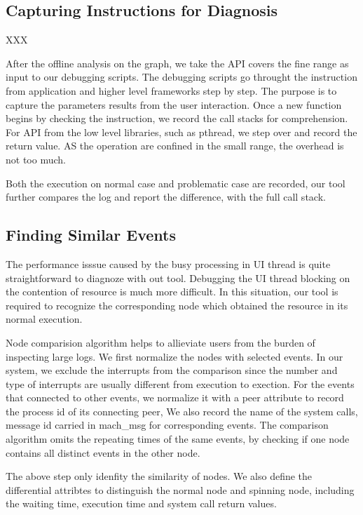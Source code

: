 \subsection{Capturing Instructions for Diagnosis}

XXX

After the offline analysis on the graph, we take the API covers the fine range as input to our debugging scripts.
The debugging scripts go throught the instruction from application and higher level frameworks step by step.
The purpose is to capture the parameters results from the user interaction.
Once a new function begins by checking the instruction, we record the call stacks for comprehension. 
For API from the low level libraries, such as pthread, we step over and record the return value.
AS the operation are confined in the small range, the overhead is not too much.

Both the execution on normal case and problematic case are recorded, our tool further compares the log and report
the difference, with the full call stack.

\subsection{Finding Similar Events}

The performance isssue caused by the busy processing in UI thread is quite straightforward to diagnoze with out tool.
Debugging the UI thread blocking on the contention of resource is much more difficult.
In this situation, our tool is required to recognize the corresponding node
which obtained the resource in its normal execution.

Node comparision algorithm helps to allieviate users from the burden of inspecting large logs.
We first normalize the nodes with selected events.
In our system, we exclude the interrupts from the comparison
since the number and type of interrupts are usually different from execution to exection.
For the events that connected to other events, we normalize it with a peer attribute
to record the process id of its connecting peer,
We also record the name of the system calls, message id carried in mach\_msg for corresponding events.
The comparison algorithm omits the repeating times of the same events,
by checking if one node contains all distinct events in the other node.

The above step only idenfity the similarity of nodes.
We also define the differential attribtes to distinguish the normal node and spinning node,
including the waiting time, execution time and system call return values.

